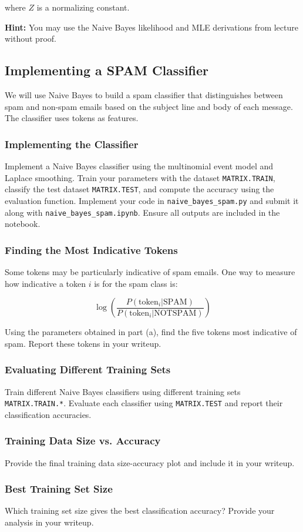 \documentclass[lang=cn,11pt]{elegantbook}
\begin{document}
where $Z$ is a normalizing constant.

\textbf{Hint:} You may use the Naive Bayes likelihood and MLE derivations from lecture without proof.

\subsection{Implementing a SPAM Classifier}

We will use Naive Bayes to build a spam classifier that distinguishes between spam and non-spam emails based on the subject line and body of each message. The classifier uses tokens as features.

\subsubsection{Implementing the Classifier}

Implement a Naive Bayes classifier using the multinomial event model and Laplace smoothing. Train your parameters with the dataset \texttt{MATRIX.TRAIN}, classify the test dataset \texttt{MATRIX.TEST}, and compute the accuracy using the evaluation function. Implement your code in \texttt{naive\_bayes\_spam.py} and submit it along with \texttt{naive\_bayes\_spam.ipynb}. Ensure all outputs are included in the notebook.

\subsubsection{Finding the Most Indicative Tokens}

Some tokens may be particularly indicative of spam emails. One way to measure how indicative a token $i$ is for the spam class is:

\begin{equation}
    \log \left( \frac{P(\text{token}_i | \text{SPAM})}{P(\text{token}_i | \text{NOTSPAM})} \right)
\end{equation}

Using the parameters obtained in part (a), find the five tokens most indicative of spam. Report these tokens in your writeup.

\subsubsection{Evaluating Different Training Sets}

Train different Naive Bayes classifiers using different training sets \texttt{MATRIX.TRAIN.*}. Evaluate each classifier using \texttt{MATRIX.TEST} and report their classification accuracies.

\subsubsection{Training Data Size vs. Accuracy}

Provide the final training data size-accuracy plot and include it in your writeup.

\subsubsection{Best Training Set Size}

Which training set size gives the best classification accuracy? Provide your analysis in your writeup.
\end{document}
